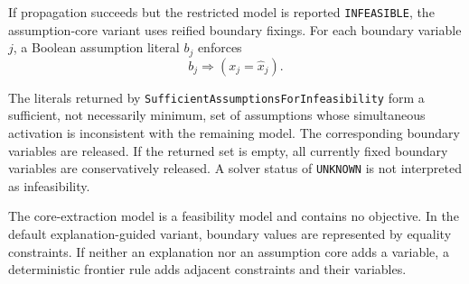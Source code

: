 \documentclass[pdflatex,sn-mathphys-num,iicol,oneside]{sn-jnl}
\begin{document}
If propagation succeeds but the restricted model is reported
\texttt{INFEASIBLE}, the assumption-core variant uses reified
boundary fixings. For each boundary variable $j$, a Boolean assumption
literal $b_j$ enforces
\begin{equation}
b_j
\Rightarrow
\left(
x_j=\widehat{x}_j
\right).
\end{equation}

The literals returned by
\texttt{SufficientAssumptionsForInfeasibility} form a sufficient, not
necessarily minimum, set of assumptions whose simultaneous activation
is inconsistent with the remaining model. The corresponding boundary
variables are released. If the returned set is empty, all currently
fixed boundary variables are conservatively released. A solver status
of \texttt{UNKNOWN} is not interpreted as infeasibility.

The core-extraction model is a feasibility model and contains no
objective. In the default explanation-guided variant, boundary values
are represented by equality constraints. If neither an explanation
nor an assumption core adds a variable, a deterministic frontier rule
adds adjacent constraints and their variables.
\end{document}
